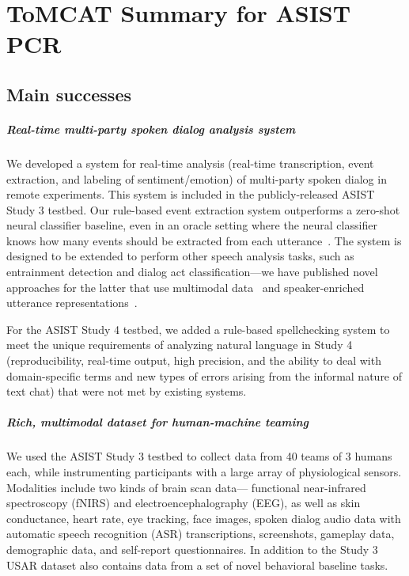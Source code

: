 \documentclass[11pt,article,oneside]{memoir}
\begin{document}
\chapter*{ToMCAT Summary for ASIST PCR}

\section{Main successes}

\paragraph{Real-time multi-party spoken dialog analysis system}

We developed a system for real-time analysis (real-time transcription, event
extraction, and labeling of sentiment/emotion) of multi-party spoken dialog in
remote experiments. This system is included in the publicly-released ASIST
Study 3 testbed. Our rule-based event extraction system outperforms a zero-shot
neural classifier baseline, even in an oracle setting where the neural
classifier knows how many events should be extracted from each
utterance~\citep{nitschke-etal-2022-rule}. The system is designed to be
extended to perform other speech analysis tasks, such as entrainment detection
and dialog act classification---we have published novel approaches for the
latter that use multimodal data~\citep{miah-etal-2023-hierarchical} and
speaker-enriched utterance representations~\citep{qamar-etal-2023-speaking}.

For the ASIST Study 4 testbed, we added a rule-based spellchecking system to
meet the unique requirements of analyzing natural language in Study 4
(reproducibility, real-time output, high precision, and the ability to deal
with domain-specific terms and new types of errors arising from
the informal nature of text chat) that were not met by existing systems.

\paragraph{Rich, multimodal dataset for human-machine teaming} We used the
ASIST Study 3 testbed to collect data from 40 teams of 3 humans each, while
instrumenting participants with a large array of physiological sensors.
Modalities include two kinds of brain scan data— functional near-infrared
spectroscopy (fNIRS) and electroencephalography (EEG), as well as skin
conductance, heart rate, eye tracking, face images, spoken dialog audio data
with automatic speech recognition (ASR) transcriptions, screenshots, gameplay
data, demographic data, and self-report questionnaires. In addition to the
Study 3 USAR dataset also contains data from a set of novel behavioral baseline
tasks.
\end{document}

